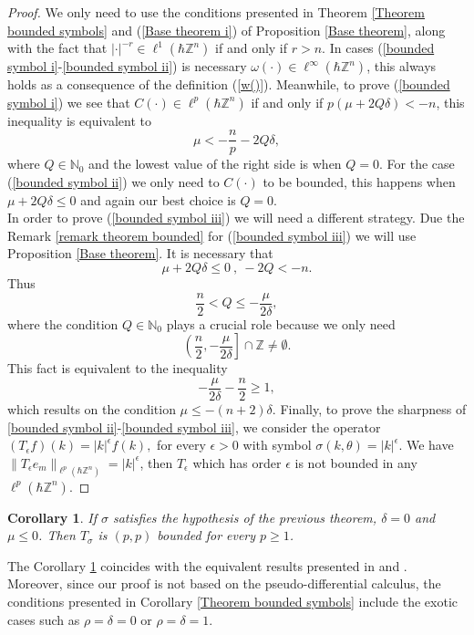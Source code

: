 \documentclass[pdflatex,sn-mathphys-num]{sn-jnl}%
\theoremstyle{thmstyleone}%
\newtheorem{corollary}{Corollary}
\theoremstyle{thmstyletwo}%
\theoremstyle{thmstylethree}%
\begin{document}
\begin{proof}
    We only need to use the conditions presented in Theorem \ref{Theorem bounded symbols} and (\ref{Base theorem i}) of Proposition \ref{Base theorem}, along with the fact that $|\cdot|^{-r}\in\ell^1(\hbar\mathbb{Z}^n)$ if and only if $r>n$. In cases (\ref{bounded symbol i}-\ref{bounded symbol ii}) is necessary $\omega(\cdot)\in\ell^\infty(\hbar\mathbb{Z}^n)$, this always holds as a consequence of the definition (\ref{w()}). Meanwhile, to prove (\ref{bounded symbol i}) we see that $C(\cdot)\in\ell^p(\hbar\mathbb{Z}^n)$ if and only if $p(\mu+2Q\delta)<-n$, this inequality is equivalent to 
    \[\mu<-\frac{n}{p}-2Q\delta, \]
    where $Q\in\mathbb{N}_0$ and the lowest value of the right side is when $Q=0$. For the case (\ref{bounded symbol ii}) we only need to $C(\cdot)$ to be bounded, this happens when $\mu+2Q\delta\leq 0$ and again our best choice is $Q=0$.\\
    \indent In order to prove (\ref{bounded symbol iii}) we will need a different strategy. Due the Remark \ref{remark theorem bounded} for (\ref{bounded symbol iii})  we will use Proposition \ref{Base theorem}. It is necessary that 
    \[\mu+2Q\delta\leq 0 \ , \ -2Q<-n.\]
    Thus
    \[\frac{n}{2}<Q\leq -\frac{\mu}{2\delta},\]
    where the condition $Q\in\mathbb{N}_0$ plays a crucial role because we only need 
    \[\left(\frac{n}{2},-\frac{\mu}{2\delta}\right]\cap \mathbb{Z}\neq \emptyset.\]
    This fact is equivalent to the inequality
    \[-\frac{\mu}{2\delta}-\frac{n}{2}\geq 1,\]
    which results on the condition $\mu\leq -(n+2)\delta$. Finally, to prove the sharpness of \ref{bounded symbol ii}-\ref{bounded symbol iii}, we consider the operator 
    $(T_\epsilon f)(k)=|k|^\epsilon f(k),$
    for every $\epsilon>0 $ with symbol $\sigma(k,\theta)=|k|^\epsilon$. We have $\|T_\epsilon e_m \|_{\ell^p(\hbar\mathbb{Z}^n)}=|k|^\epsilon$, then $T_\epsilon$ which has order $\epsilon$ is not bounded in any $\ell^p(\hbar\mathbb{Z}^n)$. 

\end{proof}
\begin{corollary}\label{lp bound special case}
    If $\sigma$ satisfies the hypothesis of the previous theorem, $\delta=0$ and $\mu\leq 0$. Then $T_\sigma$ is $(p,p)$ bounded for every $p\geq 1$.
\end{corollary}
The Corollary \ref{lp bound special case} coincides with the equivalent results presented in \cite[Theorem 5.2]{botchway2020difference} and \cite[Theorem 2.8]{rabinovich2004pseudodifference}. Moreover, since our proof is not based on the pseudo-differential calculus, the conditions presented in Corollary \ref{Theorem bounded symbols} include the exotic cases such as $\rho=\delta=0$ or $\rho=\delta=1$. 
\end{document}
